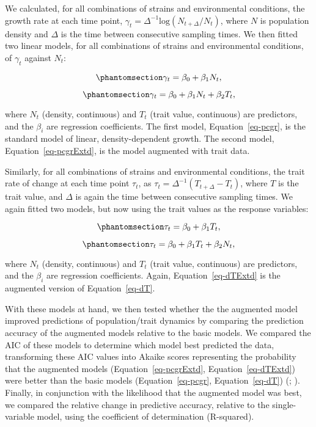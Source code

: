 \documentclass[
  letterpaper,
  DIV=11,
  numbers=noendperiod]{scrartcl}
\begin{document}
We calculated, for all combinations of strains and environmental
conditions, the growth rate at each time point,
\(\gamma_t=\Delta^{-1}\textrm{log}(N_{t+\Delta}/N_t)\), where \(N\) is
population density and \(\Delta\) is the time between consecutive
sampling times. We then fitted two linear models, for all combinations
of strains and environmental conditions, of \(\gamma_t\) against
\(N_t\):

\begin{equation}\phantomsection\label{eq-pcgr}{
\gamma_t = \beta_0 + \beta_1 N_t,
}\end{equation}

\begin{equation}\phantomsection\label{eq-pcgrExtd}{
\gamma_t = \beta_0 + \beta_1 N_t + \beta_2 T_t,
}\end{equation}

where \(N_t\) (density, continuous) and \(T_t\) (trait value,
continuous) are predictors, and the \(\beta_i\) are regression
coefficients. The first model, Equation~\ref{eq-pcgr}, is the standard
model of linear, density-dependent growth. The second model,
Equation~\ref{eq-pcgrExtd}, is the model augmented with trait data.

Similarly, for all combinations of strains and environmental conditions,
the trait rate of change at each time point \(\tau_t\), as
\(\tau_t=\Delta^{-1}(T_{t+\Delta}-T_{t})\), where \(T\) is the trait
value, and \(\Delta\) is again the time between consecutive sampling
times. We again fitted two models, but now using the trait values as the
response variables:

\begin{equation}\phantomsection\label{eq-dT}{
\tau_t = \beta_0 + \beta_1 T_t,
}\end{equation}

\begin{equation}\phantomsection\label{eq-dTExtd}{
\tau_t = \beta_0 + \beta_1 T_t + \beta_2 N_t,
}\end{equation}

where \(N_t\) (density, continuous) and \(T_t\) (trait value,
continuous) are predictors, and the \(\beta_i\) are regression
coefficients. Again, Equation~\ref{eq-dTExtd} is the augmented version
of Equation~\ref{eq-dT}.

With these models at hand, we then tested whether the the augmented
model improved predictions of population/trait dynamics by comparing the
prediction accuracy of the augmented models relative to the basic
models. We compared the AIC of these models to determine which model
best predicted the data, transforming these AIC values into Akaike
scores representing the probability that the augmented models
(Equation~\ref{eq-pcgrExtd}, Equation~\ref{eq-dTExtd}) were better than
the basic models (Equation~\ref{eq-pcgr}, Equation~\ref{eq-dT})
(;
). Finally, in
conjunction with the likelihood that the augmented model was best, we
compared the relative change in predictive accuracy, relative to the
single-variable model, using the coefficient of determination
(R-squared).
\end{document}
